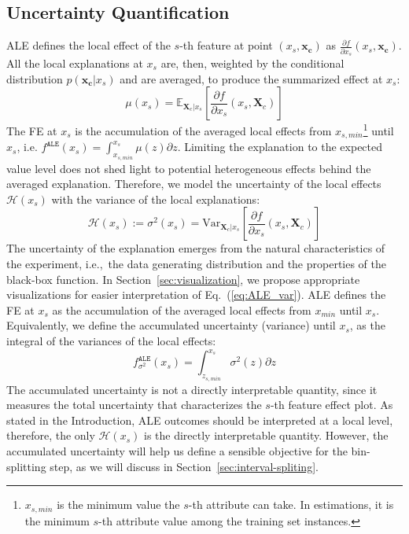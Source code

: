 \documentclass[twoside]{article}
\newcommand{\dfdx}{\frac{\partial f}{\partial x_s}}
\newcommand{\xc}{\mathbf{x_c}}
\newcommand{\Xcb}{\mathbf{X}_c}
\begin{document}
\subsection{Uncertainty Quantification}
\label{sec:NAME-definition}

ALE defines the local effect of the \(s\)-th feature at point
\((x_s, \xc)\) as \(\dfdx (x_s, \xc)\). All the local explanations at
\(x_s\) are, then, weighted by the conditional distribution
\(p(\xc|x_s)\) and are averaged, to produce the summarized effect at
\(x_s\):
\begin{equation}
  \label{eq:ALE_mean}
  \mu(x_s) = \mathbb{E}_{\Xcb|x_s}\left [\dfdx (x_s, \Xcb)\right ]
\end{equation}
%
The FE at \(x_s\) is the accumulation of the averaged local effects
from \(x_{s, min}\)\footnote{\(x_{s,min}\) is the minimum value the
  \(s\)-th attribute can take. In estimations, it is the minimum
  \(s\)-th attribute value among the training set instances.} until
\(x_s\), i.e.
\(f^{\mathtt{ALE}}(x_s) = \int_{x_{s, min}}^{x_s} \mu(z) \partial z
\). Limiting the explanation to the expected value level does not
shed light to potential heterogeneous effects behind the averaged
explanation. Therefore, we model the uncertainty of the local effects
\(\mathcal{H}(x_s)\) with the variance of the local explanations:
\begin{equation}
  \label{eq:ALE_var}
  \mathcal{H}(x_s) := \sigma^2(x_s) = \mathrm{Var}_{\Xcb|x_s}\left [\dfdx (x_s, \Xcb) \right ]
\end{equation}
\noindent
The uncertainty of the explanation emerges from the natural
characteristics of the experiment, i.e.,~the data generating
distribution and the properties of the black-box function. In
Section~\ref{sec:visualization}, we propose appropriate visualizations
for easier interpretation of Eq.~(\ref{eq:ALE_var}). ALE defines the
FE at \(x_s\) as the accumulation of the averaged local effects from
\(x_{min}\) until \(x_s\). Equivalently, we define the accumulated
uncertainty (variance) until \(x_s\), as the integral of the variances
of the local effects:
\begin{equation}
  \label{eq:ALE_accumulated_var}
  f^{\mathtt{ALE}}_{\sigma^2}(x_s) = \int_{z_{s, min}}^{x_s} \sigma^2(z) \partial z
\end{equation}
\noindent
The accumulated uncertainty is not a directly interpretable quantity,
since it measures the total uncertainty that characterizes the
\(s\)-th feature effect plot. As stated in the Introduction, ALE
outcomes should be interpreted at a local level, therefore, the only
\(\mathcal{H}(x_s)\) is the directly interpretable quantity. However,
the accumulated uncertainty will help us define a sensible objective
for the bin-splitting step, as we will discuss in
Section~\ref{sec:interval-spliting}.
\end{document}

